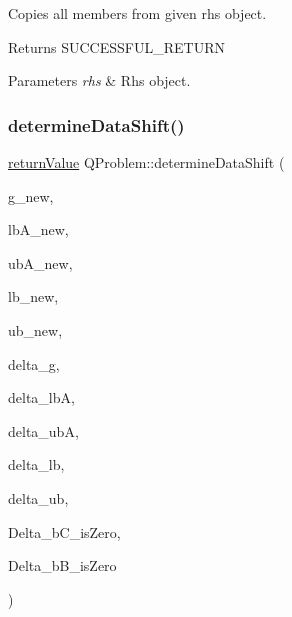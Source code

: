 Copies all members from given rhs object. \begin{DoxyReturn}{Returns}
S\+U\+C\+C\+E\+S\+S\+F\+U\+L\+\_\+\+R\+E\+T\+U\+RN 
\end{DoxyReturn}

\begin{DoxyParams}{Parameters}
{\em rhs} & Rhs object. \\
\hline
\end{DoxyParams}
\mbox{\label{class_q_problem_aa72f6a87e8dcda0a07353d3d25eb11a1}} 
\subsubsection{\texorpdfstring{determine\+Data\+Shift()}{determineDataShift()}}
{\footnotesize\ttfamily \hyperlink{_message_handling_8hpp_a81d556f613bfbabd0b1f9488c0fa865e}{return\+Value} Q\+Problem\+::determine\+Data\+Shift (\begin{DoxyParamCaption}\item[{const \hyperlink{qp_o_a_s_e_s__wrapper_8h_a0d00e2b3dfadee81331bbb39068570c4}{real\+\_\+t} $\ast$const}]{g\+\_\+new,  }\item[{const \hyperlink{qp_o_a_s_e_s__wrapper_8h_a0d00e2b3dfadee81331bbb39068570c4}{real\+\_\+t} $\ast$const}]{lb\+A\+\_\+new,  }\item[{const \hyperlink{qp_o_a_s_e_s__wrapper_8h_a0d00e2b3dfadee81331bbb39068570c4}{real\+\_\+t} $\ast$const}]{ub\+A\+\_\+new,  }\item[{const \hyperlink{qp_o_a_s_e_s__wrapper_8h_a0d00e2b3dfadee81331bbb39068570c4}{real\+\_\+t} $\ast$const}]{lb\+\_\+new,  }\item[{const \hyperlink{qp_o_a_s_e_s__wrapper_8h_a0d00e2b3dfadee81331bbb39068570c4}{real\+\_\+t} $\ast$const}]{ub\+\_\+new,  }\item[{\hyperlink{qp_o_a_s_e_s__wrapper_8h_a0d00e2b3dfadee81331bbb39068570c4}{real\+\_\+t} $\ast$const}]{delta\+\_\+g,  }\item[{\hyperlink{qp_o_a_s_e_s__wrapper_8h_a0d00e2b3dfadee81331bbb39068570c4}{real\+\_\+t} $\ast$const}]{delta\+\_\+lbA,  }\item[{\hyperlink{qp_o_a_s_e_s__wrapper_8h_a0d00e2b3dfadee81331bbb39068570c4}{real\+\_\+t} $\ast$const}]{delta\+\_\+ubA,  }\item[{\hyperlink{qp_o_a_s_e_s__wrapper_8h_a0d00e2b3dfadee81331bbb39068570c4}{real\+\_\+t} $\ast$const}]{delta\+\_\+lb,  }\item[{\hyperlink{qp_o_a_s_e_s__wrapper_8h_a0d00e2b3dfadee81331bbb39068570c4}{real\+\_\+t} $\ast$const}]{delta\+\_\+ub,  }\item[{\hyperlink{_types_8hpp_a20f82124c82b6f5686a7fce454ef9089}{Boolean\+Type} \&}]{Delta\+\_\+b\+C\+\_\+is\+Zero,  }\item[{\hyperlink{_types_8hpp_a20f82124c82b6f5686a7fce454ef9089}{Boolean\+Type} \&}]{Delta\+\_\+b\+B\+\_\+is\+Zero }\end{DoxyParamCaption})\hspace{0.3cm}{\ttfamily [protected]}}

